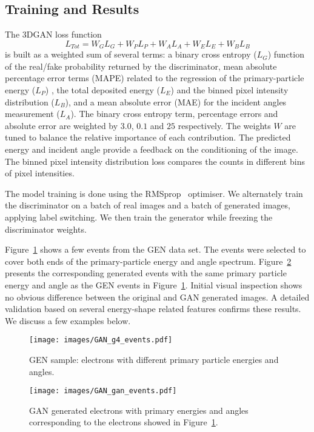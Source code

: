 \subsection{Training and Results}
The 3DGAN loss function
\begin{equation}
    L_{Tot} = W_{G}L_{G} + W_{P}L_{P} + W_{A}L_{A} + W_{E}L_{E} + W_{B}L_{B} 
\label{eq:loss}
\end{equation}
is built as a weighted sum of several terms: a binary cross entropy ($L_{G}$) function of the real/fake probability returned by the discriminator, mean absolute percentage error terms (MAPE) related to the regression of the primary-particle energy ($L_{P}$) , the total deposited energy ($L_{E}$) and the binned pixel intensity distribution ($L_{B}$), and a mean absolute error (MAE) for the incident angles measurement ($L_{A}$). The binary cross entropy term, percentage errors and absolute error are weighted by $3.0$, $0.1$ and $25$ respectively. The weights $W$ are tuned to balance the relative importance of each contribution. The predicted energy and incident angle provide a feedback on the conditioning of the image. The binned pixel intensity distribution loss compares the counts in different bins of pixel intensities. 

The model training is done using the RMSprop~\cite{rmsProp} optimiser. We alternately train the discriminator on a batch of real images and a batch of generated images, applying label switching. We then train the generator while freezing the discriminator weights.

Figure~\ref{fig:GEANT4_events} shows a few events from the GEN data set. The events were selected to cover both ends of the primary-particle energy and angle spectrum. Figure~\ref{fig:GAN_events} presents the corresponding generated events with the same primary particle energy and angle as the GEN events in Figure~\ref{fig:GEANT4_events}. Initial visual inspection shows no obvious difference between the original and GAN generated images. A detailed validation based on several energy-shape related features confirms these results. We discuss a few examples below.

\begin{figure}[htbp]
    \texttt{[image: images/GAN\_g4\_events.pdf]}
    \caption{GEN sample: electrons with different primary particle energies and angles.}
    \label{fig:GEANT4_events}
\end{figure}

\begin{figure}[htbp]
    \texttt{[image: images/GAN\_gan\_events.pdf]}
    \caption{GAN generated electrons with primary energies and angles corresponding to the electrons showed in Figure~\ref{fig:GEANT4_events}.}
    \label{fig:GAN_events}
\end{figure}

